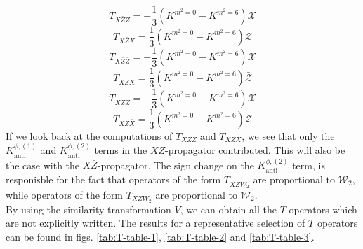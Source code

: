 %
%
\begin{equation}
T_{X\bar{Z}Z} =  -\frac{1}{3} \left(
K^{m^2=0} - K^{m^2=6}
\right)
\mathcal{X}
\end{equation}
%
%
\begin{equation}
T_{X\bar{Z}X} =  \frac{1}{3} \left(
K^{m^2=0} - K^{m^2=6}
\right)
\mathcal{Z}
\end{equation}
%
%
\begin{equation}
T_{X\bar{Z}\bar{Z}} =  -\frac{1}{3} \left(
K^{m^2=0} - K^{m^2=6}
\right)
\bar{\mathcal{X}}
\end{equation}
%
%
\begin{equation}
T_{X\bar{Z}\bar{X}} =  \frac{1}{3} \left(
K^{m^2=0} - K^{m^2=6}
\right)
\bar{\mathcal{Z}}
\end{equation}
%
%
\begin{equation}
T_{XZ\bar{Z}} =  -\frac{1}{3} \left(
K^{m^2=0} - K^{m^2=6}
\right)
\mathcal{X}
\end{equation}
%
%
\begin{equation}
T_{XZ\bar{X}} =  \frac{1}{3} \left(
K^{m^2=0} - K^{m^2=6}
\right)
\mathcal{Z}
\end{equation}
%
%
If we look back at the computations of $T_{XZZ}$ and $T_{XZX}$, we see that only the $K^{\phi,(1)}_{\text{anti}}$ and $K^{\phi,(2)}_{\text{anti}}$ terms in the $XZ$-propagator contributed. This will also be the case with the $X\bar{Z}$-propagator. The sign change on the $K^{\phi,(2)}_{\text{anti}}$ term, is responisble for the fact that operators of the form $T_{X \bar{Z} W_2}$ are proportional to $\mathcal{W}_2$, while operators of the form $T_{X Z W_2}$ are proportional to $\mathcal{\bar{W}}_2$.\\
By using the similarity transformation $V$, we can obtain all the $T$ operators which are not explicitly written. The results for a representative selection of $T$ operators can be found in figs. \ref{tab:T-table-1}, \ref{tab:T-table-2} and \ref{tab:T-table-3}.
%
%
